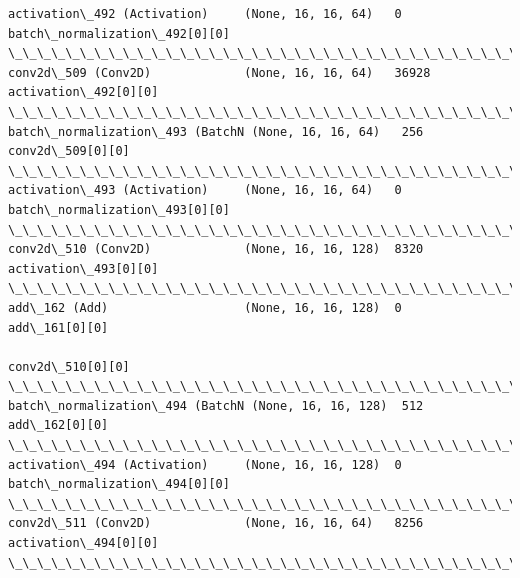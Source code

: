 \documentclass[11pt]{article}
\begin{document}
\begin{Verbatim}[commandchars=\\\{\}]
activation\_492 (Activation)     (None, 16, 16, 64)   0           batch\_normalization\_492[0][0]    
\_\_\_\_\_\_\_\_\_\_\_\_\_\_\_\_\_\_\_\_\_\_\_\_\_\_\_\_\_\_\_\_\_\_\_\_\_\_\_\_\_\_\_\_\_\_\_\_\_\_\_\_\_\_\_\_\_\_\_\_\_\_\_\_\_\_\_\_\_\_\_\_\_\_\_\_\_\_\_\_\_\_\_\_\_\_\_\_\_\_\_\_\_\_\_\_\_\_
conv2d\_509 (Conv2D)             (None, 16, 16, 64)   36928       activation\_492[0][0]             
\_\_\_\_\_\_\_\_\_\_\_\_\_\_\_\_\_\_\_\_\_\_\_\_\_\_\_\_\_\_\_\_\_\_\_\_\_\_\_\_\_\_\_\_\_\_\_\_\_\_\_\_\_\_\_\_\_\_\_\_\_\_\_\_\_\_\_\_\_\_\_\_\_\_\_\_\_\_\_\_\_\_\_\_\_\_\_\_\_\_\_\_\_\_\_\_\_\_
batch\_normalization\_493 (BatchN (None, 16, 16, 64)   256         conv2d\_509[0][0]                 
\_\_\_\_\_\_\_\_\_\_\_\_\_\_\_\_\_\_\_\_\_\_\_\_\_\_\_\_\_\_\_\_\_\_\_\_\_\_\_\_\_\_\_\_\_\_\_\_\_\_\_\_\_\_\_\_\_\_\_\_\_\_\_\_\_\_\_\_\_\_\_\_\_\_\_\_\_\_\_\_\_\_\_\_\_\_\_\_\_\_\_\_\_\_\_\_\_\_
activation\_493 (Activation)     (None, 16, 16, 64)   0           batch\_normalization\_493[0][0]    
\_\_\_\_\_\_\_\_\_\_\_\_\_\_\_\_\_\_\_\_\_\_\_\_\_\_\_\_\_\_\_\_\_\_\_\_\_\_\_\_\_\_\_\_\_\_\_\_\_\_\_\_\_\_\_\_\_\_\_\_\_\_\_\_\_\_\_\_\_\_\_\_\_\_\_\_\_\_\_\_\_\_\_\_\_\_\_\_\_\_\_\_\_\_\_\_\_\_
conv2d\_510 (Conv2D)             (None, 16, 16, 128)  8320        activation\_493[0][0]             
\_\_\_\_\_\_\_\_\_\_\_\_\_\_\_\_\_\_\_\_\_\_\_\_\_\_\_\_\_\_\_\_\_\_\_\_\_\_\_\_\_\_\_\_\_\_\_\_\_\_\_\_\_\_\_\_\_\_\_\_\_\_\_\_\_\_\_\_\_\_\_\_\_\_\_\_\_\_\_\_\_\_\_\_\_\_\_\_\_\_\_\_\_\_\_\_\_\_
add\_162 (Add)                   (None, 16, 16, 128)  0           add\_161[0][0]                    
                                                                 conv2d\_510[0][0]                 
\_\_\_\_\_\_\_\_\_\_\_\_\_\_\_\_\_\_\_\_\_\_\_\_\_\_\_\_\_\_\_\_\_\_\_\_\_\_\_\_\_\_\_\_\_\_\_\_\_\_\_\_\_\_\_\_\_\_\_\_\_\_\_\_\_\_\_\_\_\_\_\_\_\_\_\_\_\_\_\_\_\_\_\_\_\_\_\_\_\_\_\_\_\_\_\_\_\_
batch\_normalization\_494 (BatchN (None, 16, 16, 128)  512         add\_162[0][0]                    
\_\_\_\_\_\_\_\_\_\_\_\_\_\_\_\_\_\_\_\_\_\_\_\_\_\_\_\_\_\_\_\_\_\_\_\_\_\_\_\_\_\_\_\_\_\_\_\_\_\_\_\_\_\_\_\_\_\_\_\_\_\_\_\_\_\_\_\_\_\_\_\_\_\_\_\_\_\_\_\_\_\_\_\_\_\_\_\_\_\_\_\_\_\_\_\_\_\_
activation\_494 (Activation)     (None, 16, 16, 128)  0           batch\_normalization\_494[0][0]    
\_\_\_\_\_\_\_\_\_\_\_\_\_\_\_\_\_\_\_\_\_\_\_\_\_\_\_\_\_\_\_\_\_\_\_\_\_\_\_\_\_\_\_\_\_\_\_\_\_\_\_\_\_\_\_\_\_\_\_\_\_\_\_\_\_\_\_\_\_\_\_\_\_\_\_\_\_\_\_\_\_\_\_\_\_\_\_\_\_\_\_\_\_\_\_\_\_\_
conv2d\_511 (Conv2D)             (None, 16, 16, 64)   8256        activation\_494[0][0]             
\_\_\_\_\_\_\_\_\_\_\_\_\_\_\_\_\_\_\_\_\_\_\_\_\_\_\_\_\_\_\_\_\_\_\_\_\_\_\_\_\_\_\_\_\_\_\_\_\_\_\_\_\_\_\_\_\_\_\_\_\_\_\_\_\_\_\_\_\_\_\_\_\_\_\_\_\_\_\_\_\_\_\_\_\_\_\_\_\_\_\_\_\_\_\_\_\_\_

\end{Verbatim}
\end{document}
